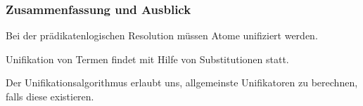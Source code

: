 \documentclass[aspectratio=1610,onlymath]{beamer}
\begin{document}
% 
% 

% 
% 
% 


\begin{frame}\frametitle{Zusammenfassung und Ausblick}

Bei der prädikatenlogischen Resolution müssen Atome unifiziert werden.\bigskip

Unifikation von Termen findet mit Hilfe von Substitutionen statt.
\bigskip

Der Unifikationsalgorithmus erlaubt uns, allgemeinste Unifikatoren zu berechnen, falls
diese existieren.
\bigskip


\end{frame}




% 
% 
% 
% 
% 
% 
\end{document}

